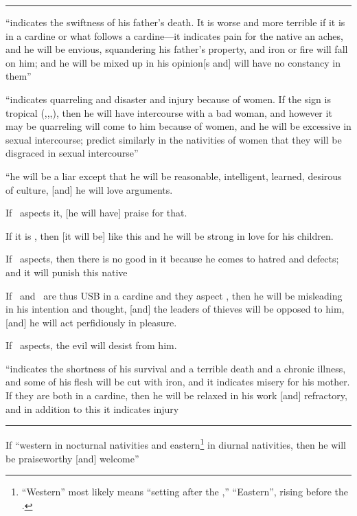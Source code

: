 \begin{description}[style=multiline,leftmargin=1.5cm]
\vspace{0.5em}\hrule
\item[\Mars,\Sun]
``indicates the swiftness of his father's death. It is worse and more terrible if it is in a cardine or what follows a cardine---it indicates pain for the native an aches, and he will be envious, squandering his father's property, and iron or fire will fall on him; and he will be mixed up in his opinion[s and] will have no constancy in them''

\item[\Mars,\Venus]
``indicates quarreling and disaster and injury because of women. If the sign is tropical (\Aries,\Cancer,\Libra,\Capricorn), then he will have intercourse with a bad woman, and however it may be quarreling will come to him because of women, and he will be excessive in sexual intercourse; predict similarly in the nativities of women that they will be disgraced in sexual intercourse''

\item[\Mars,\Mercury]
``he will be a liar except that he will be reasonable, intelligent, learned, desirous of culture, [and] he will love arguments. 

If \Jupiter\, aspects it, [he will have] praise for that. 

If it is \Venus, then [it will be] like this and he will be strong in love for his children. 

If \Saturn\, aspects, then there is no good in it because he comes to hatred and defects; and it will punish this native

If \Mercury\, and \Mars\, are thus USB in a cardine and they aspect \Venus, then he will be misleading in his intention and thought, [and] the leaders of thieves will be opposed to him, [and] he will act perfidiously in pleasure.

If \Jupiter\, aspects, the evil will desist from him.

\item[\Mars,\Moon]
``indicates the shortness of his survival and a terrible death and a chronic illness, and some of his flesh will be cut with iron, and it indicates misery for his mother. If they are both in a cardine, then he will be relaxed in his work [and] refractory, and in addition to this it indicates injury

\vspace{0.5em}\hrule
\item[\Sun,\Venus]
If ``western in nocturnal nativities and eastern\footnote{``Western'' most likely means ``setting after the \Sun,'' ``Eastern'', rising before the \Sun.} in diurnal nativities, then he will be praiseworthy [and] welcome''


\end{description}

